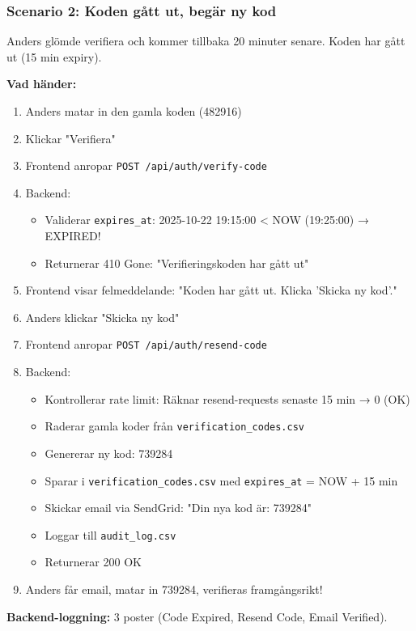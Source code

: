 \documentclass[12pt,a4paper]{article}
\begin{document}
\subsubsection{Scenario 2: Koden gått ut, begär ny kod}
Anders glömde verifiera och kommer tillbaka 20 minuter senare. Koden har gått ut (15 min expiry).

\textbf{Vad händer:}
\begin{enumerate}[noitemsep]
  \item Anders matar in den gamla koden (482916)
  \item Klickar "Verifiera"
  \item Frontend anropar \texttt{POST /api/auth/verify-code}
  \item Backend:
  \begin{itemize}[noitemsep]
    \item Validerar \texttt{expires\_at}: 2025-10-22 19:15:00 < NOW (19:25:00) → EXPIRED!
    \item Returnerar 410 Gone: "Verifieringskoden har gått ut"
  \end{itemize}
  \item Frontend visar felmeddelande: "Koden har gått ut. Klicka 'Skicka ny kod'."
  \item Anders klickar "Skicka ny kod"
  \item Frontend anropar \texttt{POST /api/auth/resend-code}
  \item Backend:
  \begin{itemize}[noitemsep]
    \item Kontrollerar rate limit: Räknar resend-requests senaste 15 min → 0 (OK)
    \item Raderar gamla koder från \texttt{verification\_codes.csv}
    \item Genererar ny kod: 739284
    \item Sparar i \texttt{verification\_codes.csv} med \texttt{expires\_at} = NOW + 15 min
    \item Skickar email via SendGrid: "Din nya kod är: 739284"
    \item Loggar till \texttt{audit\_log.csv}
    \item Returnerar 200 OK
  \end{itemize}
  \item Anders får email, matar in 739284, verifieras framgångsrikt!
\end{enumerate}

\textbf{Backend-loggning:} 3 poster (Code Expired, Resend Code, Email Verified).
\end{document}

